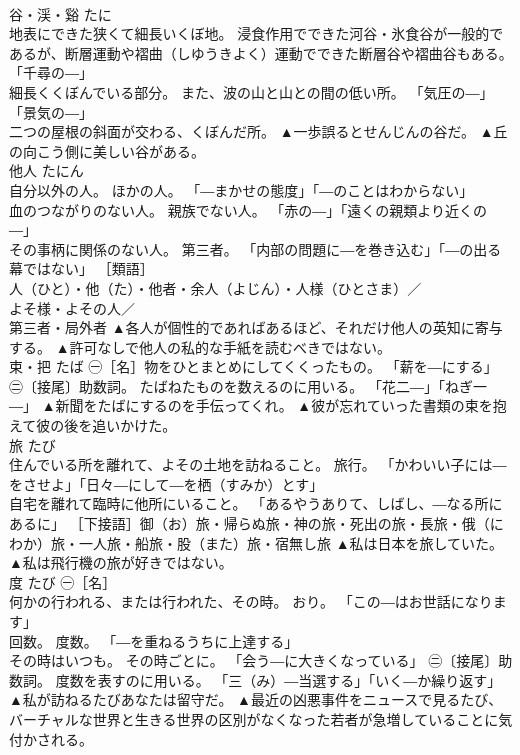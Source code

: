 \documentclass[8pt]{extreport}
\begin{document}
\begin{CJK}{UTF8}{min}
\\	谷・渓・谿	たに	
\\	地表にできた狭くて細長いくぼ地。 浸食作用でできた河谷・氷食谷が一般的であるが、断層運動や褶曲（しゆうきよく）運動でできた断層谷や褶曲谷もある。 「千尋の―」 
\\	細長くくぼんでいる部分。 また、波の山と山との間の低い所。 「気圧の―」「景気の―」 
\\	二つの屋根の斜面が交わる、くぼんだ所。	▲一歩誤るとせんじんの谷だ。 ▲丘の向こう側に美しい谷がある。
\\	他人	たにん	
\\	自分以外の人。 ほかの人。 「―まかせの態度」「―のことはわからない」 
\\	血のつながりのない人。 親族でない人。 「赤の―」「遠くの親類より近くの―」 
\\	その事柄に関係のない人。 第三者。 「内部の問題に―を巻き込む」「―の出る幕ではない」 ［類語］
\\	人（ひと）・他（た）・他者・余人（よじん）・人様（ひとさま）／
\\	よそ様・よその人／
\\	第三者・局外者	▲各人が個性的であればあるほど、それだけ他人の英知に寄与する。 ▲許可なしで他人の私的な手紙を読むべきではない。
\\	束・把	たば	㊀［名］物をひとまとめにしてくくったもの。 「薪を―にする」 ㊁〔接尾〕助数詞。 たばねたものを数えるのに用いる。 「花二―」「ねぎ一―」	▲新聞をたばにするのを手伝ってくれ。 ▲彼が忘れていった書類の束を抱えて彼の後を追いかけた。
\\	旅	たび	
\\	住んでいる所を離れて、よその土地を訪ねること。 旅行。 「かわいい子には―をさせよ」「日々―にして―を栖（すみか）とす」 
\\	自宅を離れて臨時に他所にいること。 「あるやうありて、しばし、―なる所にあるに」 ［下接語］御（お）旅・帰らぬ旅・神の旅・死出の旅・長旅・俄（にわか）旅・一人旅・船旅・股（また）旅・宿無し旅	▲私は日本を旅していた。 ▲私は飛行機の旅が好きではない。
\\	度	たび	㊀［名］ 
\\	何かの行われる、または行われた、その時。 おり。 「この―はお世話になります」 
\\	回数。 度数。 「―を重ねるうちに上達する」 
\\	その時はいつも。 その時ごとに。 「会う―に大きくなっている」 ㊁〔接尾〕助数詞。 度数を表すのに用いる。 「三（み）―当選する」「いく―か繰り返す」	▲私が訪ねるたびあなたは留守だ。 ▲最近の凶悪事件をニュースで見るたび、バーチャルな世界と生きる世界の区別がなくなった若者が急増していることに気付かされる。

\end{CJK}
\end{document}
